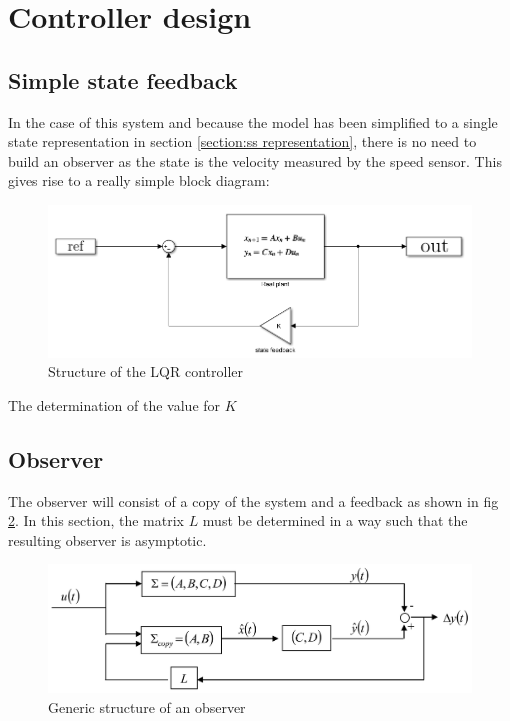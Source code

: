 \section{Controller design}

\subsection{Simple state feedback}

In the case of this system and because the model has been simplified to a single state representation in section
\ref{section:ss representation}, there is no need to build an observer as the state is the velocity measured by the 
speed sensor. This gives rise to a really simple block diagram:

\begin{figure}[H]
    \centering
    \includegraphics[width = \textwidth]{Pictures/lqr_controller.png}
    \caption{Structure of the LQR controller}
    \label{fig:lqr structure}
\end{figure}

The determination of the value for $K$


\iffalse
\subsection{Observer}

The observer will consist of a copy of the system and a feedback as shown in fig \ref{fig:observer structure}. In this
section, the matrix $L$ must be determined in a way such that the resulting observer is asymptotic.

\begin{figure}[H]
    \centering
    \includegraphics[height=\textheight/7]{Pictures/observer_general_structure.png}
    \caption{Generic structure of an observer}
    \label{fig:observer structure}
\end{figure}

